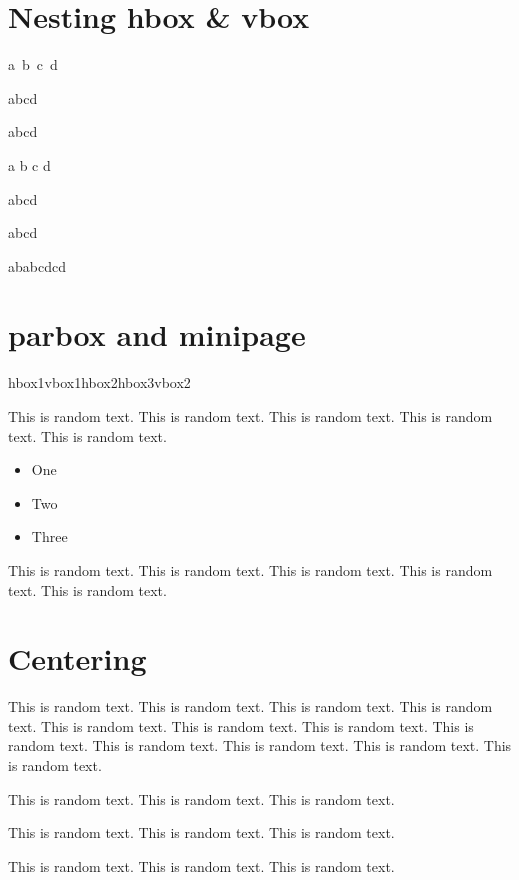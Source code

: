 \documentclass{article}
\begin{document}
\section{Nesting hbox \& vbox}
\hbox{a b c d}

\hbox{\hbox{a}\hbox{b}\hbox{c}\hbox{d}}

\hbox{\vbox{a}\vbox{b}\vbox{c}\vbox{d}}

\vbox{a b c d}

\vbox{\hbox{a}\hbox{b}\hbox{c}\hbox{d}}

\vbox{\vbox{a}\vbox{b}\vbox{c}\vbox{d}}

\hbox{\hbox{a}\hbox{b}\vbox{\hbox{a}\hbox{b}\hbox{c}\hbox{d}}\hbox{c}\hbox{d}}

\section{parbox and minipage}

\parbox{2in}{%
  \hbox{hbox1}\vbox{vbox1}\hbox{hbox2}\hbox{hbox3}\vbox{vbox2}}

\begin{minipage}{2in}
This is random text. This is random text.
This is random text. This is random text. This is random text.
\begin{itemize}
\item One
\item Two
\item Three
\end{itemize}
This is random text. This is random text.
This is random text. This is random text. This is random text.
\end{minipage}


\section{Centering}

\begin{center}
This is random text. This is random text. This is random text.
This is random text. This is random text. This is random text.
This is random text. This is random text. This is random text.
This is random text. This is random text. This is random text.
\end{center}

\begin{center}
This is random text. This is random text. This is random text.

This is random text. This is random text. This is random text.

This is random text. This is random text. This is random text.
\end{center}
\end{document}
